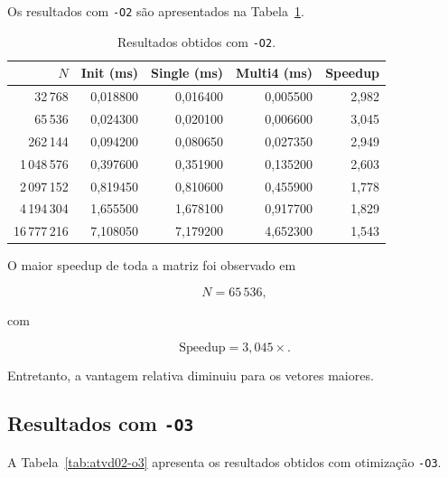 Os resultados com \texttt{-O2} são apresentados na
Tabela~\ref{tab:atvd02-o2}.

\begin{table}[htbp]
\centering
\caption{Resultados obtidos com \texttt{-O2}.}
\label{tab:atvd02-o2}
\small
\begin{tabular}{r|r|r|r|r}
\hline
\(N\) & Init (ms) & Single (ms) & Multi4 (ms) & Speedup \\
\hline
32\,768      & 0,018800 & 0,016400 & 0,005500 & 2,982 \\
65\,536      & 0,024300 & 0,020100 & 0,006600 & 3,045 \\
262\,144     & 0,094200 & 0,080650 & 0,027350 & 2,949 \\
1\,048\,576  & 0,397600 & 0,351900 & 0,135200 & 2,603 \\
2\,097\,152  & 0,819450 & 0,810600 & 0,455900 & 1,778 \\
4\,194\,304  & 1,655500 & 1,678100 & 0,917700 & 1,829 \\
16\,777\,216 & 7,108050 & 7,179200 & 4,652300 & 1,543 \\
\hline
\end{tabular}
\end{table}

O maior speedup de toda a matriz foi observado em

\begin{equation}
N=65\,536,
\end{equation}

com

\begin{equation}
\text{Speedup}=3{,}045\times.
\end{equation}

Entretanto, a vantagem relativa diminuiu para os vetores maiores.


\subsection{Resultados com \texttt{-O3}}

A Tabela~\ref{tab:atvd02-o3} apresenta os resultados obtidos com otimização
\texttt{-O3}.

